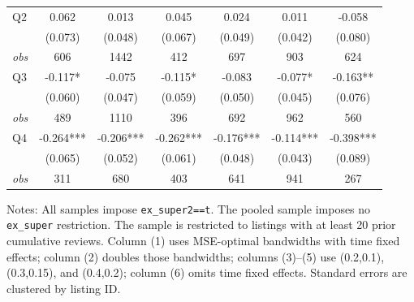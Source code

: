 \begin{table}[!htbp]
\begin{tabular}{lcccccc}
Q2 & 0.062 & 0.013 & 0.045 & 0.024 & 0.011 & -0.058 \\
 & (0.073) & (0.048) & (0.067) & (0.049) & (0.042) & (0.080) \\
\textit{obs} & 606 & 1442 & 412 & 697 & 903 & 624 \\
Q3 & -0.117* & -0.075 & -0.115* & -0.083 & -0.077* & -0.163** \\
 & (0.060) & (0.047) & (0.059) & (0.050) & (0.045) & (0.076) \\
\textit{obs} & 489 & 1110 & 396 & 692 & 962 & 560 \\
Q4 & -0.264*** & -0.206*** & -0.262*** & -0.176*** & -0.114*** & -0.398*** \\
 & (0.065) & (0.052) & (0.061) & (0.048) & (0.043) & (0.089) \\
\textit{obs} & 311 & 680 & 403 & 641 & 941 & 267 \\
\bottomrule
\end{tabular}
\begin{minipage}{0.98\textwidth}\footnotesize
Notes: All samples impose \texttt{ex\_super2==t}. The pooled sample imposes no \texttt{ex\_super} restriction. The sample is restricted to listings with at least 20 prior cumulative reviews. Column (1) uses MSE-optimal bandwidths with time fixed effects; column (2) doubles those bandwidths; columns (3)--(5) use (0.2,0.1), (0.3,0.15), and (0.4,0.2); column (6) omits time fixed effects. Standard errors are clustered by listing ID.
\end{minipage}
\end{table}

